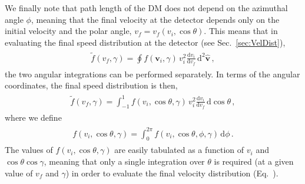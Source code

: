 \documentclass[prd,twocolumn,showpacs,nofootinbib,aps]{revtex4-1}
\newcommand{\dbd}[2]{\frac{\mathrm{d}#1}{\mathrm{d}#2}}
\begin{document}
We finally note that path length of the DM does not depend on the azimuthal angle $\phi$, meaning that the final velocity at the detector depends only on the initial velocity and the polar angle, $v_f = v_f(v_i, \cos\theta)$. This means that in evaluating the final speed distribution at the detector (see Sec.~\ref{sec:VelDist}),
\begin{align}
\begin{split}
\tilde{f}(v_f,\gamma) = \oint f(\mathbf{v}_i,\gamma) \,v_i^2 \dbd{v_i}{v_f} \, \mathrm{d}^2\hat{\mathbf{v}}\,,
\end{split}
\end{align}
the two angular integrations can be performed separately. In terms of the angular coordinates, the final speed distribution is then,
\begin{align}
\begin{split}
\label{eq:fvf}
\tilde{f}(v_f,\gamma) = \int_{-1}^{1} f(v_i, \cos\theta, \gamma)\, v_i^2 \dbd{v_i}{v_f} \,\mathrm{d}\cos\theta\,,
\end{split}
\end{align}
where we define
\begin{align}
\begin{split}
\label{eq:fcostheta}
f(v_i, \cos\theta, \gamma) = \int_{0}^{2\pi} f(v_i, \cos\theta,\phi,\gamma)\,\mathrm{d}\phi\,.
\end{split}
\end{align}
The values of $f(v_i, \cos\theta, \gamma)$ are easily tabulated as a function of $v_i$ and $\cos\theta \cos\gamma$, meaning that only a single integration over $\theta$ is required (at a given value of $v_f$ and $\gamma$) in order to evaluate the final velocity distribution (Eq.~).


\end{document}
